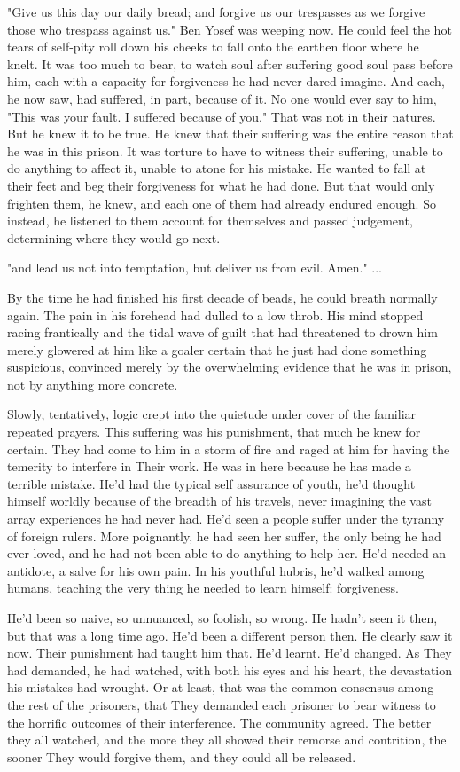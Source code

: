 \documentclass{amsart}
\begin{document}
"Give us this day our daily bread; and forgive us our trespasses as we forgive those who trespass against us." Ben Yosef was weeping now. He could feel the hot tears of self-pity roll down his cheeks to fall onto the earthen floor where he knelt. It was too much to bear, to watch soul after suffering good soul pass before him, each with a capacity for forgiveness he had never dared imagine. And each, he now saw, had suffered, in part, because of it. No one would ever say to him, "This was your fault. I suffered because of you." That was not in their natures. But he knew it to be true. He knew that their suffering was the entire reason that he was in this prison. It was torture to have to witness their suffering, unable to do anything to affect it, unable to atone for his mistake. He wanted to fall at their feet and beg their forgiveness for what he had done. But that would only frighten them, he knew, and each one of them had already endured enough. So instead, he listened to them account for themselves and passed judgement, determining where they would go next. 

"and lead us not into temptation, but deliver us from evil. Amen." ...

By the time he had finished his first decade of beads, he could breath normally again. The pain in his forehead had dulled to a low throb. His mind stopped racing frantically and the tidal wave of guilt that had threatened to drown him merely glowered at him like a goaler certain that he just had done something suspicious, convinced merely by the overwhelming evidence that he was in prison, not by anything more concrete.

Slowly, tentatively, logic crept into the quietude under cover of the familiar repeated prayers. This suffering was his punishment, that much he knew for certain. They had come to him in a storm of fire and raged at him for having the temerity to interfere in Their work. He was in here because he has made a terrible mistake. He'd had the typical self assurance of youth, he'd thought himself worldly because of the breadth of his travels, never imagining the vast array experiences he had never had. He'd seen a people suffer under the tyranny of foreign rulers. More poignantly, he had seen her suffer, the only being he had ever loved, and he had not been able to do anything to help her. He'd needed an antidote, a salve for his own pain. In his youthful hubris, he'd walked among humans, teaching the very thing he needed to learn himself: forgiveness.

He'd been so naive, so unnuanced, so foolish, so wrong. He hadn't seen it then, but that was a long time ago. He'd been a different person then. He clearly saw it now. Their punishment had taught him that. He'd learnt. He'd changed. As They had demanded, he had watched, with both his eyes and his heart, the devastation his mistakes had wrought. Or at least, that was the common consensus among the rest of the prisoners, that They demanded each prisoner to bear witness to the horrific outcomes of their interference. The community agreed. The better they all watched, and the more they all showed their remorse and contrition, the sooner They would forgive them, and they could all be released.
\end{document}
